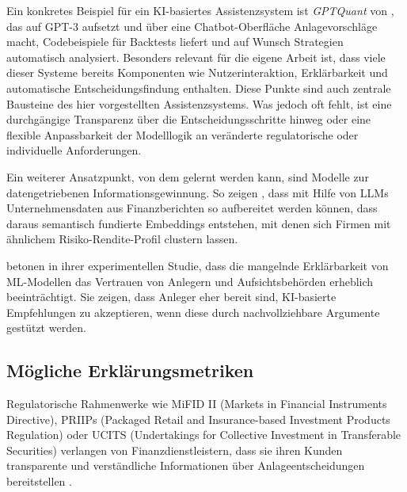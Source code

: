     Ein konkretes Beispiel für ein \acs{KI}-basiertes Assistenzsystem ist \textit{GPTQuant} von \textcite{yue2023}, das auf GPT-3 aufsetzt und über eine Chatbot-Oberfläche Anlagevorschläge macht, Codebeispiele für Backtests liefert und auf Wunsch Strategien automatisch analysiert.
    Besonders relevant für die eigene Arbeit ist, dass viele dieser Systeme bereits Komponenten wie Nutzerinteraktion, Erklärbarkeit und automatische Entscheidungsfindung enthalten.
    Diese Punkte sind auch zentrale Bausteine des hier vorgestellten Assistenzsystems.
    Was jedoch oft fehlt, ist eine durchgängige Transparenz über die Entscheidungsschritte hinweg oder eine flexible Anpassbarkeit der Modelllogik an veränderte regulatorische oder individuelle Anforderungen.

    Ein weiterer Ansatzpunkt, von dem gelernt werden kann, sind Modelle zur datengetriebenen Informationsgewinnung.
    So zeigen \textcite{vamvourellis2023}, dass mit Hilfe von \acs{LLM}s Unternehmensdaten aus Finanzberichten so aufbereitet werden können, dass daraus semantisch fundierte Embeddings entstehen, mit denen sich Firmen mit ähnlichem Risiko-Rendite-Profil clustern lassen.

    \textcite{bendavid2021explainable} betonen in ihrer experimentellen Studie, dass die mangelnde Erklärbarkeit von \acs{ML}-Modellen das Vertrauen von Anlegern und Aufsichtsbehörden erheblich beeinträchtigt.
    Sie zeigen, dass Anleger eher bereit sind, \acs{KI}-basierte Empfehlungen zu akzeptieren, wenn diese durch nachvollziehbare Argumente gestützt werden.

  \subsection{Mögliche Erklärungsmetriken}


    Regulatorische Rahmenwerke wie MiFID II (Markets in Financial Instruments Directive), PRIIPs (Packaged Retail and Insurance-based Investment Products Regulation) oder UCITS (Undertakings for Collective Investment in Transferable Securities) verlangen von Finanzdienstleistern, dass sie ihren Kunden transparente und verständliche Informationen über Anlageentscheidungen bereitstellen \autocite{eprsRetail2023}.

